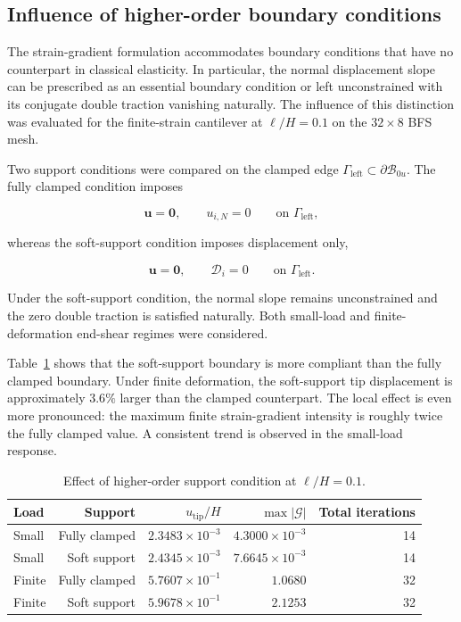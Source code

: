\documentclass[preprint,12pt]{elsarticle}
\begin{document}
\subsection{Influence of higher-order boundary conditions}

\label{sec:higher_order_bc}

The strain-gradient formulation accommodates boundary conditions that have no
counterpart in classical elasticity. In particular, the normal displacement slope
can be prescribed as an essential boundary condition or left unconstrained with its
conjugate double traction vanishing naturally. The influence of this distinction was
evaluated for the finite-strain cantilever at $\ell/H=0.1$ on the $32\times8$ BFS mesh.

Two support conditions were compared on the clamped edge $\Gamma_{\mathrm{left}}\subset\partial\mathcal{B}_{0u}$.  The fully clamped condition imposes

\begin{equation}
 \mathbf{u}=\mathbf{0},
 \qquad
 u_{i,N}=0
 \qquad \text{on } \Gamma_{\mathrm{left}},
 \label{eq:clamped_higher_order_bc}
\end{equation}

whereas the soft-support condition imposes displacement only,

\begin{equation}
 \mathbf{u}=\mathbf{0},
 \qquad
 \mathcal{D}_i=0
 \qquad \text{on } \Gamma_{\mathrm{left}}.
 \label{eq:soft_higher_order_bc}
\end{equation}

Under the soft-support condition, the normal slope remains unconstrained and the
zero double traction is satisfied naturally. Both small-load and finite-deformation
end-shear regimes were considered.

Table~\ref{tab:higher_order_bc_response} shows that the soft-support boundary is
more compliant than the fully clamped boundary. Under finite deformation, the
soft-support tip displacement is approximately $3.6\%$ larger than the clamped
counterpart. The local effect is even more pronounced: the maximum finite
strain-gradient intensity is roughly twice the fully clamped value. A consistent
trend is observed in the small-load response.

\begin{table}[htbp]
\centering
\caption{Effect of higher-order support condition at $\ell/H=0.1$.}
\label{tab:higher_order_bc_response}
\small
\begin{tabular}{lrrrr}
\toprule
Load & Support & $u_{\mathrm{tip}}/H$ & $\max|\mathcal{G}|$ & Total iterations \\
\midrule
Small & Fully clamped & $2.3483\times10^{-3}$ & $4.3000\times10^{-3}$ & 14 \\
Small & Soft support  & $2.4345\times10^{-3}$ & $7.6645\times10^{-3}$ & 14 \\
\midrule
Finite & Fully clamped & $5.7607\times10^{-1}$ & $1.0680$ & 32 \\
Finite & Soft support  & $5.9678\times10^{-1}$ & $2.1253$ & 32 \\
\bottomrule
\end{tabular}
\end{table}
\end{document}

